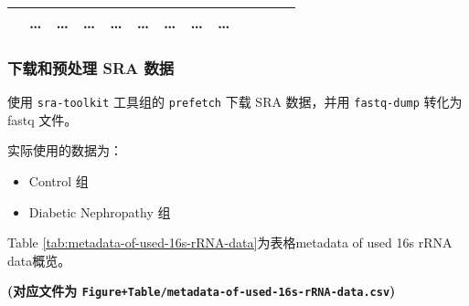 \documentclass[
]{article}
\providecommand{\tightlist}{%
  \setlength{\itemsep}{0pt}\setlength{\parskip}{0pt}}
\begin{document}
\begin{longtable}[]{@{}lllllllllllll@{}}
\begin{minipage}[t]{0.05\columnwidth}
\end{minipage} & \begin{minipage}[t]{0.05\columnwidth}\raggedright
\ldots{}\strut
\end{minipage} & \begin{minipage}[t]{0.05\columnwidth}\raggedright
\ldots{}\strut
\end{minipage} & \begin{minipage}[t]{0.05\columnwidth}\raggedright
\ldots{}\strut
\end{minipage} & \begin{minipage}[t]{0.05\columnwidth}\raggedright
\ldots{}\strut
\end{minipage} & \begin{minipage}[t]{0.05\columnwidth}\raggedright
\ldots{}\strut
\end{minipage} & \begin{minipage}[t]{0.05\columnwidth}\raggedright
\ldots{}\strut
\end{minipage} & \begin{minipage}[t]{0.08\columnwidth}\raggedright
\ldots{}\strut
\end{minipage} & \begin{minipage}[t]{0.02\columnwidth}\raggedright
\ldots{}\strut
\end{minipage}\tabularnewline
\bottomrule
\end{longtable}

\hypertarget{ux4e0bux8f7dux548cux9884ux5904ux7406-sra-ux6570ux636e}{%
\subsubsection{下载和预处理 SRA 数据}\label{ux4e0bux8f7dux548cux9884ux5904ux7406-sra-ux6570ux636e}}

使用 \texttt{sra-toolkit} 工具组的 \texttt{prefetch} 下载 SRA 数据，并用 \texttt{fastq-dump} 转化为 fastq 文件。

实际使用的数据为：

\begin{itemize}
\tightlist
\item
  Control 组
\item
  Diabetic Nephropathy 组
\end{itemize}

Table \ref{tab:metadata-of-used-16s-rRNA-data}为表格metadata of used 16s rRNA data概览。

\textbf{(对应文件为 \texttt{Figure+Table/metadata-of-used-16s-rRNA-data.csv})}
\end{document}
